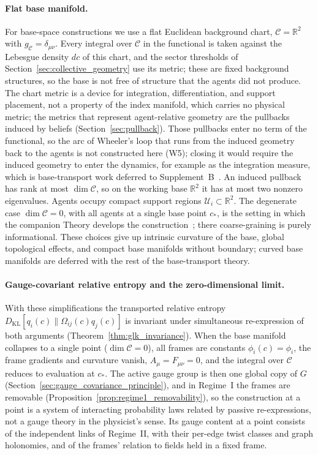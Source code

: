 \documentclass[11pt]{article}
\begin{document}
\paragraph{Flat base manifold.}
\label{sec:flat_base}
For base-space constructions we use a flat Euclidean background chart, $\mathcal{C} = \mathbb{R}^2$ with $g_{\mathcal{C}} = \delta_{\mu\nu}$. Every integral over $\mathcal{C}$ in the functional is taken against the Lebesgue density $dc$ of this chart, and the sector thresholds of Section~\ref{sec:collective_geometry} use its metric; these are fixed background structures, so the base is not free of structure that the agents did not produce. The chart metric is a device for integration, differentiation, and support placement, not a property of the index manifold, which carries no physical metric; the metrics that represent agent-relative geometry are the pullbacks induced by beliefs (Section~\ref{sec:pullback}). Those pullbacks enter no term of the functional, so the arc of Wheeler's loop that runs from the induced geometry back to the agents is not constructed here (W5); closing it would require the induced geometry to enter the dynamics, for example as the integration measure, which is base-transport work deferred to Supplement~B~\cite{DennisGaugeVFESuppB2026}. An induced pullback has rank at most $\dim\mathcal{C}$, so on the working base $\mathbb{R}^2$ it has at most two nonzero eigenvalues. Agents occupy compact support regions $\mathcal{U}_i \subset \mathbb{R}^2$. The degenerate case $\dim\mathcal{C}=0$, with all agents at a single base point $c_*$, is the setting in which the companion Theory develops the construction~\cite[Ch.~2]{DennisGaugeVFE2026}; there coarse-graining is purely informational. These choices give up intrinsic curvature of the base, global topological effects, and compact base manifolds without boundary; curved base manifolds are deferred with the rest of the base-transport theory.

\paragraph{Gauge-covariant relative entropy and the zero-dimensional limit.}
With these simplifications the transported relative entropy $D_{\mathrm{KL}}[q_i(c) \| \Omega_{ij}(c)q_j(c)]$ is invariant under simultaneous re-expression of both arguments (Theorem~\ref{thm:glk_invariance}). When the base manifold collapses to a single point ($\dim\mathcal{C} = 0$), all frames are constants $\phi_i(c) = \phi_i$, the frame gradients and curvature vanish, $A_\mu = F_{\mu\nu} = 0$, and the integral over $\mathcal{C}$ reduces to evaluation at $c_*$. The active gauge group is then one global copy of $G$ (Section~\ref{sec:gauge_covariance_principle}), and in Regime~I the frames are removable (Proposition~\ref{prop:regime1_removability}), so the construction at a point is a system of interacting probability laws related by passive re-expressions, not a gauge theory in the physicist's sense. Its gauge content at a point consists of the independent links of Regime~II, with their per-edge twist classes and graph holonomies, and of the frames' relation to fields held in a fixed frame.
\end{document}
